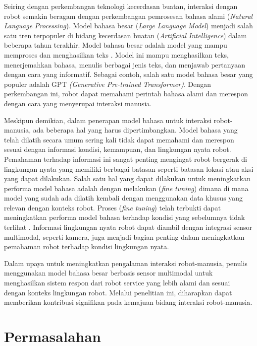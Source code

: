 Seiring dengan perkembangan teknologi kecerdasan buatan, interaksi dengan robot semakin beragam dengan perkembangan pemrosesan bahasa alami (\emph{Natural Language Processing}). Model bahasa besar (\emph{Large Language Model}) menjadi salah satu tren terpopuler di bidang kecerdasan buatan (\emph{Artificial Intelligence}) dalam beberapa tahun terakhir. Model bahasa besar adalah model yang mampu memproses dan menghasilkan teks \parencite{naveed2024comprehensive}. Model ini mampu menghasilkan teks, menerjemahkan bahasa, menulis berbagai jenis teks, dan menjawab pertanyaan dengan cara yang informatif. Sebagai contoh, salah satu model bahasa besar yang populer adalah GPT \emph{(Generative Pre-trained Transformer)}. Dengan perkembangan ini, robot dapat memahami perintah bahasa alami dan merespon dengan cara yang menyerupai interaksi manusia. 

Meskipun demikian, dalam penerapan model bahasa untuk interaksi robot-manusia, ada beberapa hal yang harus dipertimbangkan. Model bahasa yang telah dilatih secara umum sering kali tidak dapat memahami dan merespon sesuai dengan informasi kondisi, kemampuan, dan lingkungan nyata robot. Pemahaman terhadap informasi ini sangat penting mengingat robot bergerak di lingkungan nyata yang memiliki berbagai batasan seperti batasan lokasi atau aksi yang dapat dilakukan. Salah satu hal yang dapat dilakukan untuk meningkatkan performa model bahasa adalah dengan melakukan (\emph{fine tuning}) dimana di mana model yang sudah ada dilatih kembali dengan menggunakan data khusus yang relevan dengan konteks robot. Proses (\emph{fine tuning}) telah terbukti dapat meningkatkan performa model bahasa terhadap kondisi yang sebelumnya tidak terlihat \parencite{chung2022scaling}. Informasi lingkungan nyata robot dapat diambil dengan integrasi sensor multimodal, seperti kamera, juga menjadi bagian penting dalam meningkatkan pemahaman robot terhadap kondisi lingkungan nyata.

Dalam upaya untuk meningkatkan pengalaman interaksi robot-manusia, penulis menggunakan model bahasa besar berbasis sensor multimodal untuk menghasilkan sistem respon dari robot service yang lebih alami dan sesuai dengan konteks lingkungan robot. Melalui penelitian ini, diharapkan dapat memberikan kontribusi signifikan pada kemajuan bidang interaksi robot-manusia.

\section{Permasalahan}
\label{sec:permasalahan}

